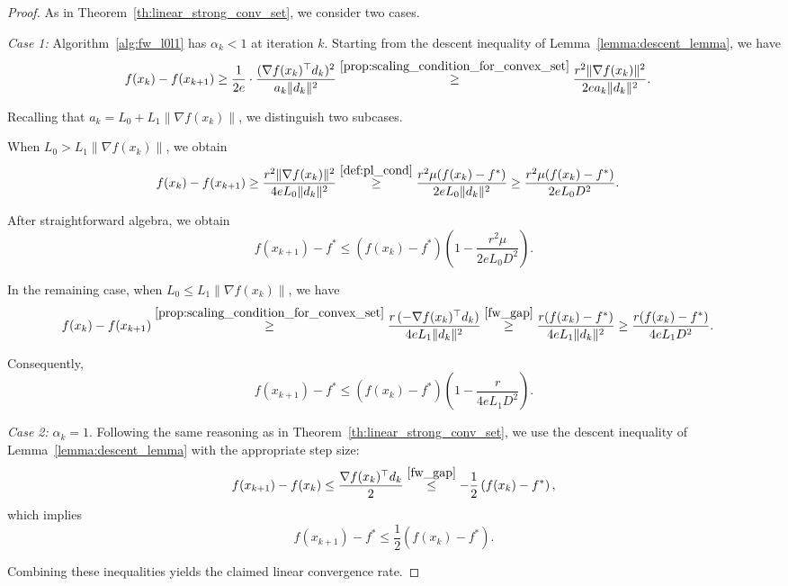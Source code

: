 \documentclass[runningheads]{llncs}
\begin{document}
	\begin{proof}
		As in Theorem~\ref{th:linear_strong_conv_set}, we consider two cases.
		
		\textit{Case 1:} Algorithm~\ref{alg:fw_l0l1} has $\alpha_k < 1$ at iteration $k$.  
		Starting from the descent inequality of Lemma~\ref{lemma:descent_lemma}, we have
		\begin{align*}
			f(x_k) - f(x_{k+1})
			&\geq \frac{1}{2e} \cdot 
			\frac{(\nabla f(x_k)^\top d_k)^2}{a_k \|d_k\|^2}
			\overset{\eqref{prop:scaling_condition_for_convex_set}}{\geq}
			\frac{r^2 \|\nabla f(x_k)\|^2}{2 e a_k \|d_k\|^2}.
		\end{align*}
		
		Recalling that $a_k = L_0 + L_1 \|\nabla f(x_k)\|$, we distinguish two subcases.
		
		When $L_0 > L_1 \|\nabla f(x_k)\|$, we obtain
		\begin{align*}
			f(x_k) - f(x_{k+1})
			&\geq \frac{r^2 \|\nabla f(x_k)\|^2}{4 e L_0 \|d_k\|^2}
			\overset{\eqref{def:pl_cond}}{\geq}
			\frac{r^2 \mu (f(x_k) - f^*)}{2 e L_0 \|d_k\|^2}
			\geq \frac{r^2 \mu (f(x_k) - f^*)}{2 e L_0 D^2}.
		\end{align*}
		
		After straightforward algebra, we obtain
		\begin{equation}\label{linear_rate_pl_alpha_less_1_case1}
			f(x_{k+1}) - f^*
			\leq (f(x_k) - f^*)
			\left( 1 - \frac{r^2 \mu}{2 e L_0 D^2} \right).
		\end{equation}
		
		In the remaining case, when $L_0 \leq L_1 \|\nabla f(x_k)\|$, we have
		\begin{equation*}
			\begin{split}
				f(x_k) - f(x_{k+1})
				&\overset{\eqref{prop:scaling_condition_for_convex_set}}{\geq}
				\frac{r\,(-\nabla f(x_k)^\top d_k)}{4 e L_1 \| d_k \|^2}
				\overset{\eqref{fw_gap}}{\ge}
				\frac{r (f(x_k) - f^*)}{4 e L_1 \| d_k \|^2}
				\geq \frac{r (f(x_k) - f^*)}{4 e L_1 D^2}.
			\end{split}
		\end{equation*}
		
		Consequently,
		\begin{equation}\label{linear_rate_pl_alpha_less_1_case2}
			f(x_{k+1}) - f^*
			\leq (f(x_k) - f^*)
			\left( 1 - \frac{r}{4 e L_1 D^2} \right).
		\end{equation}
		
		\textit{Case 2:} $\alpha_k = 1$.  
		Following the same reasoning as in Theorem~\ref{th:linear_strong_conv_set}, we use the descent inequality of Lemma~\ref{lemma:descent_lemma} with the appropriate step size:
		\[
		f(x_{k+1}) - f(x_k) \leq \frac{\nabla f(x_k)^\top d_k}{2} 
		\overset{\eqref{fw_gap}}{\leq} 
		-\frac{1}{2} \left(f(x_k) - f^*\right),
		\]
		which implies
		\[
		f(x_{k+1}) - f^* \leq \frac{1}{2} (f(x_k) - f^*).
		\]
		
		Combining these inequalities yields the claimed linear convergence rate.
	\end{proof}
	
\end{document}
